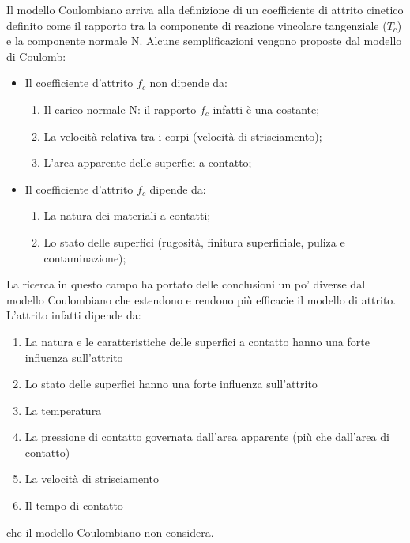 Il modello Coulombiano arriva alla definizione di un coefficiente di attrito cinetico definito come il rapporto tra la componente di reazione vincolare tangenziale ($T_c$) e la componente normale N. Alcune semplificazioni vengono proposte dal modello di Coulomb:
\begin{itemize}
\item  Il coefficiente d'attrito $f_c$ non dipende da:
\begin{enumerate}
\item Il carico normale N: il rapporto $f_c$ infatti è una costante;
\item La velocità relativa tra i corpi (velocità di strisciamento);
\item L'area apparente delle superfici a contatto;
\end{enumerate}
\item Il coefficiente d'attrito $f_c$ dipende da:
\begin{enumerate}
\item La natura dei materiali a contatti;
\item Lo stato delle superfici (rugosità, finitura superficiale, puliza e contaminazione);
\end{enumerate}
\end{itemize}

La ricerca in questo campo ha portato delle conclusioni un po' diverse dal modello Coulombiano che estendono e rendono più efficacie il modello di attrito. L'attrito infatti dipende da:
\begin{enumerate}
\item La natura e le caratteristiche delle superfici a contatto hanno una forte influenza sull'attrito
\item Lo stato delle superfici hanno una forte influenza sull'attrito
\item La temperatura
\item La pressione di contatto governata dall'area apparente (più che dall'area di contatto)
\item La velocità di strisciamento
\item Il tempo di contatto
\end{enumerate}
che il modello Coulombiano non considera.

